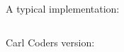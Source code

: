 A typical implementation:
\inputminted{csharp}{\context/answer/holiday/Holiday.cs}

Carl Coders version:
\inputminted{csharp}{\context/answer/carlsholiday/CarlsHoliday.cs}
